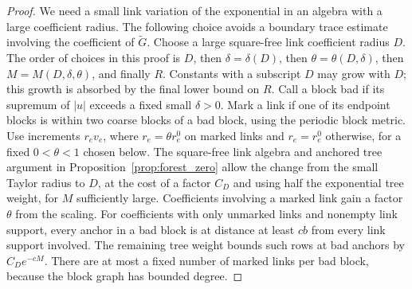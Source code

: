 \documentclass[11pt]{article}
\begin{document}
\begin{proof}
We need a small link variation of the exponential in an algebra
with a large coefficient radius. The following choice avoids a
boundary trace estimate involving the coefficient of
\(\widetilde G\). Choose a large square-free link coefficient
radius \(D\). The order of choices in this proof is
\(D\), then \(\delta=\delta(D)\), then
\(\theta=\theta(D,\delta)\), then
\(M=M(D,\delta,\theta)\), and finally \(R\).
Constants with a subscript \(D\) may grow with \(D\); this growth
is absorbed by the final lower bound on \(R\). Call a block bad if its supremum of \(|u|\) exceeds
a fixed small \(\delta>0\). Mark a link if one of its endpoint
blocks is within two coarse blocks of a bad block, using the
periodic block metric. Use increments \(r_e v_e\), where
\(r_e=\theta r_e^0\) on marked links and \(r_e=r_e^0\) otherwise,
for a fixed \(0<\theta<1\) chosen below. The square-free link
algebra and anchored tree argument in
Proposition~\ref{prop:forest_zero} allow the change from the
small Taylor radius to \(D\), at the cost of a factor \(C_D\)
and using half the exponential tree weight, for \(M\) sufficiently
large. Coefficients involving a marked link gain a factor
\(\theta\) from the scaling. For coefficients with only unmarked
links and nonempty link support, every anchor in a bad block is
at distance at least \(cb\) from every link support involved.
The remaining tree weight bounds such rows at bad anchors by
\(C_D e^{-cM}\). There are at most a fixed number of marked
links per bad block, because the block graph has bounded degree.


\end{proof}
\end{document}
